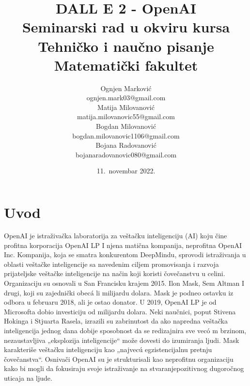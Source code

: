 \documentclass[a4paper]{article}
\begin{document}
\title{DALL E 2 - OpenAI\\ \small{Seminarski rad u okviru kursa\\Tehničko i naučno pisanje\\ Matematički fakultet}}
\author{Ognjen Marković\\ ognjen.mark03@gmail.com\\ Matija Milovanović\\ matija.milovanovic55@gmail.com\\ Bogdan Milovanović\\ bogdan.milovanovic1106@gmail.com\\ Bojana Radovanović\\ bojanaradovanovic080@gmail.com }
\date{11.~novembar 2022.}
\maketitle
{}
\tableofcontents
\newpage
\section{Uvod}
\label{sec:uvod}
OpenAI je istraživačka laboratorija za veštačku inteligenciju (AI) koju čine profitna korporacija OpenAI LP I njena matična kompanija, neprofitna OpenAI Inc. Kompanija, koja se smatra konkurentom DeepMindu, sprovodi istraživanja u oblasti veštačke inteligencije sa navedenim ciljem promovisanja i razvoja prijateljske veštačke inteligencije na način koji koristi čovečanstvu u celini. Organizaciju su osnovali u San Francisku krajem 2015. Ilon Mask, Sem Altman I drugi, koji su zajednički obecá li milijardu dolara. Mask je podneo ostavku iz odbora u februaru 2018, ali je ostao donator. U 2019, OpenAI LP je od Microsofta dobio investiciju od milijardu dolara. Neki naučnici, poput Stivena Hokinga i Stjuarta Rasela, izrazili su zabrinutost da ako napredna veštačka inteligencija jednog dana dobije sposobnost da se redizajnira sve vecó m brzinom, nezaustavljiva „eksplozija inteligencije“ može dovesti do izumiranja ljudi. Mask karakteriše veštačku inteligenciju kao „najvecú egzistencijalnu pretnju čovečanstva“. Osnivači OpenAI su je strukturisali kao neprofitnu organizaciju kako bi mogli da fokusiraju svoje istraživanje na stvaranjepozitivnog dugoročnog uticaja na ljude.
\end{document}
